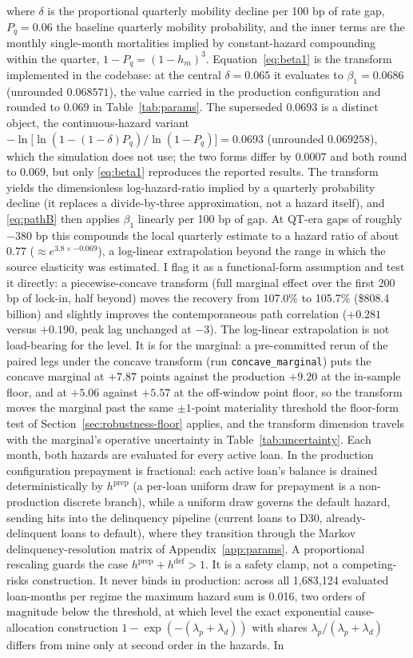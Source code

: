 \documentclass[12pt]{article}
\begin{document}
where $\delta$ is the proportional quarterly mobility decline per 100 bp of rate gap, $P_q = 0.06$ the baseline quarterly mobility probability, and the inner terms are the monthly single-month mortalities implied by constant-hazard compounding within the quarter, $1 - P_q = (1 - h_m)^3$. Equation~\eqref{eq:beta1} is the transform implemented in the codebase: at the central $\delta = 0.065$ it evaluates to $\beta_1 = 0.0686$ (unrounded $0.068571$), the value carried in the production configuration and rounded to $0.069$ in Table~\ref{tab:params}. The superseded $0.0693$ is a distinct object, the continuous-hazard variant $-\ln\!\big[\ln(1-(1-\delta)P_q)/\ln(1-P_q)\big] = 0.0693$ (unrounded $0.069258$), which the simulation does not use; the two forms differ by $0.0007$ and both round to $0.069$, but only \eqref{eq:beta1} reproduces the reported results. The transform yields the dimensionless log-hazard-ratio implied by a quarterly probability decline (it replaces a divide-by-three approximation, not a hazard itself), and \eqref{eq:pathB} then applies $\beta_1$ linearly per 100 bp of gap. At QT-era gaps of roughly $-380$ bp this compounds the local quarterly estimate to a hazard ratio of about $0.77$ ($\approx e^{3.8 \times -0.069}$), a log-linear extrapolation beyond the range in which the source elasticity was estimated. I flag it as a functional-form assumption and test it directly: a piecewise-concave transform (full marginal effect over the first 200 bp of lock-in, half beyond) moves the recovery from 107.0\% to 105.7\% (\$808.4 billion) and slightly improves the contemporaneous path correlation ($+0.281$ versus $+0.190$, peak lag unchanged at $-3$). The log-linear extrapolation is not load-bearing for the level. It is for the marginal: a pre-committed rerun of the paired legs under the concave transform (run \texttt{concave\_marginal}) puts the concave marginal at $+7.87$ points against the production $+9.20$ at the in-sample floor, and at $+5.06$ against $+5.57$ at the off-window point floor, so the transform moves the marginal past the same $\pm 1$-point materiality threshold the floor-form test of Section~\ref{sec:robustness-floor} applies, and the transform dimension travels with the marginal's operative uncertainty in Table~\ref{tab:uncertainty}. Each month, both hazards are evaluated for every active loan. In the production configuration prepayment is fractional: each active loan's balance is drained deterministically by $h^{\mathrm{prep}}$ (a per-loan uniform draw for prepayment is a non-production discrete branch), while a uniform draw governs the default hazard, sending hits into the delinquency pipeline (current loans to D30, already-delinquent loans to default), where they transition through the Markov delinquency-resolution matrix of Appendix~\ref{app:params}. A proportional rescaling guards the case $h^{\mathrm{prep}} + h^{\mathrm{def}} > 1$. It is a safety clamp, not a competing-risks construction. It never binds in production: across all 1,683,124 evaluated loan-months per regime the maximum hazard sum is 0.016, two orders of magnitude below the threshold, at which level the exact exponential cause-allocation construction $1-\exp(-(\lambda_p+\lambda_d))$ with shares $\lambda_p/(\lambda_p+\lambda_d)$ differs from mine only at second order in the hazards. In 
\end{document}
